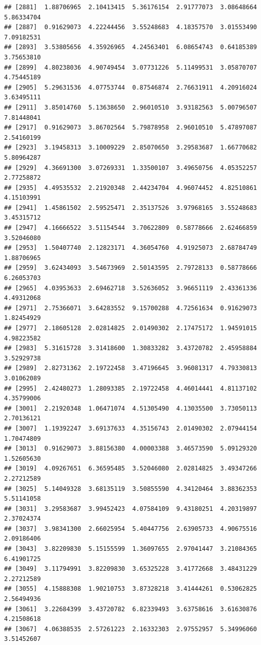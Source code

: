 \documentclass[
]{article}
\begin{document}
\begin{verbatim}
## [2881]  1.88706965  2.10413415  5.36176154  2.91777073  3.08648664  5.86334704
## [2887]  0.91629073  4.22244456  3.55248683  4.18357570  3.01553490  7.09182531
## [2893]  3.53805656  4.35926965  4.24563401  6.08654743  0.64185389  3.75653810
## [2899]  4.80238036  4.90749454  3.07731226  5.11499531  3.05870707  4.75445189
## [2905]  5.29631536  4.07753744  0.87546874  2.76631911  4.20916024  3.63495111
## [2911]  3.85014760  5.13638650  2.96010510  3.93182563  5.00796507  7.81448041
## [2917]  0.91629073  3.86702564  5.79878958  2.96010510  5.47897087  2.54160199
## [2923]  3.19458313  3.10009229  2.85070650  3.29583687  1.66770682  5.80964287
## [2929]  4.36691300  3.07269331  1.33500107  3.49650756  4.05352257  2.77258872
## [2935]  4.49535532  2.21920348  2.44234704  4.96074452  4.82510861  4.15103991
## [2941]  1.45861502  2.59525471  2.35137526  3.97968165  3.55248683  3.45315712
## [2947]  4.16666522  3.51154544  3.70622809  0.58778666  2.62466859  3.52046080
## [2953]  1.50407740  2.12823171  4.36054760  4.91925073  2.68784749  1.88706965
## [2959]  3.62434093  3.54673969  2.50143595  2.79728133  0.58778666  6.26053703
## [2965]  4.03953633  2.69462718  3.52636052  3.96651119  2.43361336  4.49312068
## [2971]  2.75366071  3.64283552  9.15700288  4.72561634  0.91629073  1.82454929
## [2977]  2.18605128  2.02814825  2.01490302  2.17475172  1.94591015  4.98223582
## [2983]  5.31615728  3.31418600  1.30833282  3.43720782  2.45958884  3.52929738
## [2989]  2.82731362  2.19722458  3.47196645  3.96081317  4.79330813  3.01062089
## [2995]  2.42480273  1.28093385  2.19722458  4.46014441  4.81137102  4.35799006
## [3001]  2.21920348  1.06471074  4.51305490  4.13035500  3.73050113  2.70136121
## [3007]  1.19392247  3.69137633  4.35156743  2.01490302  2.07944154  1.70474809
## [3013]  0.91629073  3.88156380  4.00003388  3.46573590  5.09129320  1.52605630
## [3019]  4.09267651  6.36595485  3.52046080  2.02814825  3.49347266  2.27212589
## [3025]  5.14049328  3.68135119  3.50855590  4.34120464  3.88362353  5.51141058
## [3031]  3.29583687  3.99452423  4.07584109  9.43180251  4.20319897  2.37024374
## [3037]  3.98341300  2.66025954  5.40447756  2.63905733  4.90675516  2.09186406
## [3043]  3.82209830  5.15155599  1.36097655  2.97041447  3.21084365  6.41901725
## [3049]  3.11794991  3.82209830  3.65325228  3.41772668  3.48431229  2.27212589
## [3055]  4.15888308  1.90210753  3.87328218  3.41444261  0.53062825  2.56494936
## [3061]  3.22684399  3.43720782  6.82339493  3.63758616  3.61630876  4.21508618
## [3067]  4.06388535  2.57261223  2.16332303  2.97552957  5.34996060  3.51452607

\end{verbatim}
\end{document}
